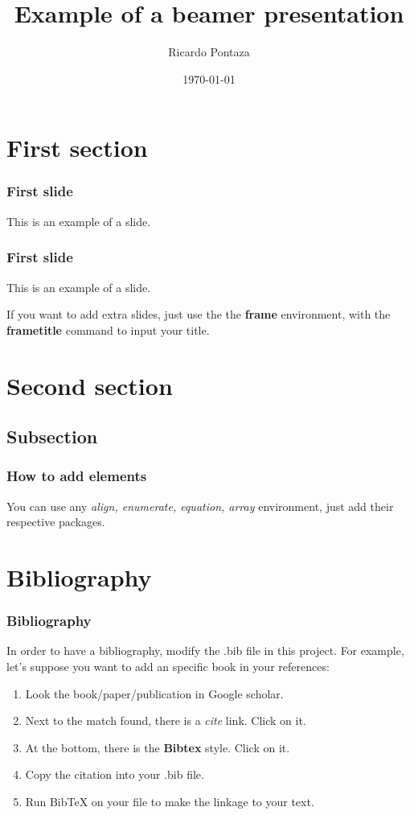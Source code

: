 \documentclass{beamer}
\begin{document}
\begin{frame}
    \title{\bf Example of a beamer presentation}
    \author{Ricardo Pontaza}
    \date{\today}
    \titlepage
\end{frame}

\section{First section}
\begin{frame}
\frametitle{First slide}
This is an example of a slide.
\end{frame}

\begin{frame}
\frametitle{First slide}
This is an example of a slide.

If you want to add extra slides, just use the the \textbf{frame} environment, with the \textbf{frametitle} command to input your title.
\end{frame}


\section{Second section}
\subsection{Subsection}
\begin{frame}
\frametitle{How to add elements}
You can use any \emph{align, enumerate, equation, array} environment, just add their respective packages.
\end{frame}

\section{Bibliography}
\begin{frame}
\frametitle{Bibliography}
In order to have a bibliography, modify the .bib file in this project. For example, let's suppose you want to add an specific book in your references:
\begin{enumerate}
\item Look the book/paper/publication in Google scholar.
\item Next to the match found, there is a \emph{cite} link. Click on it.
\item At the bottom, there is the \textbf{Bibtex} style. Click on it.
\item Copy the citation into your .bib file.
\item Run BibTeX on your file to make the linkage to your text. 
\end{enumerate}
\end{frame}
\end{document}
